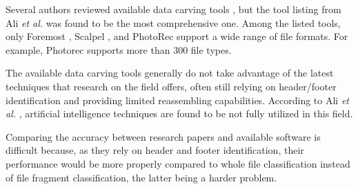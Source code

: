 Several authors reviewed  available data carving tools
\cite{ali_review_2018}
\cite{qiu_new_2014}
\cite{nadeem_ashraf_forensic_2013}
\cite{roux_reconstructing_2008}, 
but the tool listing from Ali \textit{et al.} \cite{ali_review_2018} was found to be the most comprehensive one. Among the listed tools, only Foremost \cite{kendall_foremost_2019}, Scalpel \cite{richard_iii_scalpel:_2005}, and PhotoRec \cite{grenier_photorec_2019} support a wide range of file formats. For example, Photorec supports more than 300 file types.

The available data carving tools generally do not take advantage of the latest techniques that research on the field offers, often still relying on header/footer identification and providing limited reassembling capabilities.
According to Ali \textit{et al.} \cite{ali_review_2018}, artificial intelligence techniques are found to be not fully utilized in this field.

Comparing the accuracy between research papers and available software is difficult because, as they rely on header and footer identification, their performance would be more properly compared to whole file classification instead of file fragment classification, the latter being a harder problem.


